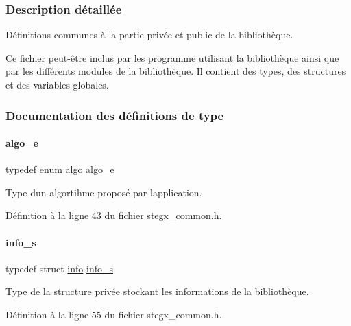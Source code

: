 \subsubsection{Description détaillée}
Définitions communes à la partie privée et public de la bibliothèque. 

Ce fichier peut-\/être inclus par les programme utilisant la bibliothèque ainsi que par les différents modules de la bibliothèque. Il contient des types, des structures et des variables globales. 

\subsubsection{Documentation des définitions de type}
\mbox{\label{a00008_adbe3e383e3f1c4239b26ccae2865aa06}} 
\paragraph{\texorpdfstring{algo\+\_\+e}{algo\_e}}
{\footnotesize\ttfamily typedef enum \hyperlink{a00008_ad3066b71c7c05f99ce6c3bd88da7ac23}{algo} \hyperlink{a00008_adbe3e383e3f1c4239b26ccae2865aa06}{algo\+\_\+e}}

Type d\textquotesingle{}un algortihme proposé par l\textquotesingle{}application. 

Définition à la ligne 43 du fichier stegx\+\_\+common.\+h.

\mbox{\label{a00008_aa8ca908d92fb5bdd3c0a9e1f58b2cf03}} 
\paragraph{\texorpdfstring{info\+\_\+s}{info\_s}}
{\footnotesize\ttfamily typedef struct \hyperlink{a00154}{info} \hyperlink{a00008_aa8ca908d92fb5bdd3c0a9e1f58b2cf03}{info\+\_\+s}}

Type de la structure privée stockant les informations de la bibliothèque. 

Définition à la ligne 55 du fichier stegx\+\_\+common.\+h.

\mbox{\label{a00008_ad7acd42acef1f832c261f34b380de326}} 
